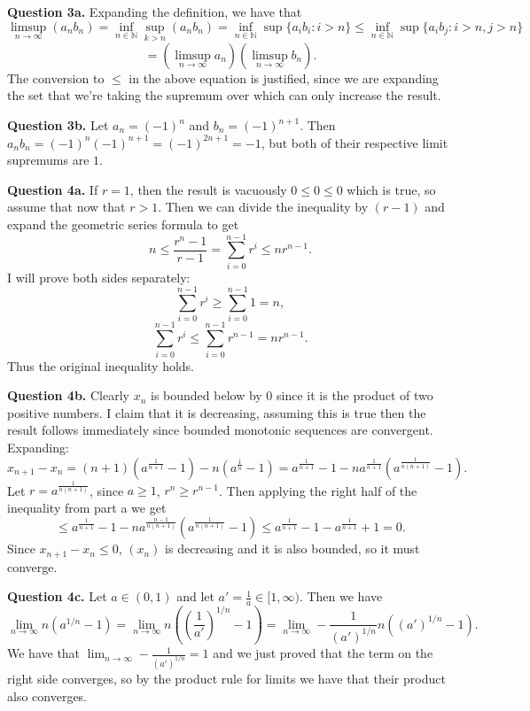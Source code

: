 \documentclass[letterpaper, reqno,11pt]{article}
\begin{document}
\newpage\phantom{blabla}
\newpage

{\medskip\noindent\bf Question 3a.} Expanding the definition, we have that
\[
\limsup_{n\to\infty}(a_nb_n)=\inf_{n\in \mathbb{N}}\sup_{k>n}(a_nb_n)=\inf_{n\in \mathbb{N}}\sup\{a_ib_i: i>n\}\leq \inf_{n\in \mathbb{N}}\sup\{a_ib_j: i>n,j>n\}
\]
\[
=\left( \limsup_{n\to\infty}a_n \right) \left( \limsup_{n\to\infty}b_n \right)
.\]
The conversion to $\leq$ in the above equation is justified, since we are expanding the set that we're taking the supremum over which can only increase the result.

{\medskip\noindent\bf Question 3b.} Let $a_n=(-1)^{n}$ and $b_n=(-1)^{n+1}$. Then $a_nb_n=(-1)^{n}(-1)^{n+1}=(-1)^{2n+1}=-1$, but both of their respective limit supremums are $1$.

\newpage\phantom{blabla}
\newpage

{\medskip\noindent\bf Question 4a.} If $r=1$, then the result is vacuously $0\leq 0\leq 0$ which is true, so assume that now that $r>1$. Then we can divide the inequality by $(r-1)$ and expand the geometric series formula to get
\[
n\leq \frac{r^{n}-1}{r-1}=\sum_{i=0}^{n-1}r^{i}\leq nr^{n-1}
.\]
I will prove both sides separately:
\[
\sum_{i=0}^{n-1}r^{i}\geq \sum_{i=0}^{n-1}1=n
,\]
\[
\sum_{i=0}^{n-1}r^{i}\leq \sum_{i=0}^{n-1}r^{n-1}=nr^{n-1}
.\]
Thus the original inequality holds.

{\medskip\noindent\bf Question 4b.} Clearly $x_n$ is bounded below by $0$ since it is the product of two positive numbers. I claim that it is decreasing, assuming this is true then the result follows immediately since bounded monotonic sequences are convergent. Expanding:
\[
    x_{n+1}-x_n=(n+1)\left( a^{\frac{1}{n+1}}-1 \right) -n\left( a^{\frac{1}{n}}-1 \right) =a^{\frac{1}{n+1}}-1-na^{\frac{1}{n+1}}\left( a^{\frac{1}{n(n+1)}}-1 \right) 
.\]
Let $r=a^{\frac{1}{n(n+1)}}$, since $a\geq 1$, $r^{n}\geq r^{n-1}$. Then applying the right half of the inequality from part a we get
\[
\leq a^{\frac{1}{n+1}}-1-na^{\frac{n-1}{n(n+1)}}\left( a^{\frac{1}{n(n+1)}}-1 \right)\leq a^{\frac{1}{n+1}} -1 -a^{\frac{1}{n+1}}+1=0
.\]
Since $x_{n+1}-x_n\leq 0$, $(x_n)$ is decreasing and it is also bounded, so it must converge.

{\medskip\noindent\bf Question 4c.} Let $a\in(0,1)$ and let $a'=\frac{1}{a}\in [1,\infty)$. Then we have
\[
\lim_{n\to\infty}n(a^{1 /n}-1)=\lim_{n\to\infty}n\left(\left(\frac{1}{a'}\right)^{1 /n}-1\right)=\lim_{n\to\infty}-\frac{1}{(a')^{1 /n}}n\left( (a')^{1 /n}-1 \right)
.\]
We have that $\lim_{n\to\infty}-\frac{1}{(a')^{1 /n}}=1$ and we just proved that the term on the right side converges, so by the product rule for limits we have that their product also converges.
\end{document}
